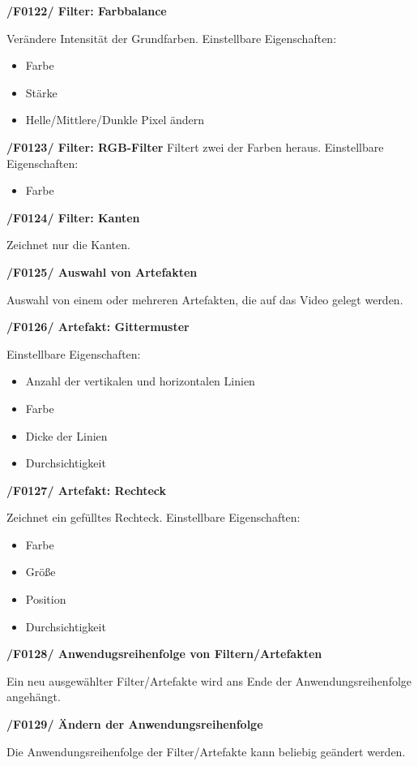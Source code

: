 \documentclass[parskip=full]{scrartcl}
\begin{document}
\textbf{/F0122/ Filter: Farbbalance}

Verändere Intensität der Grundfarben.
Einstellbare Eigenschaften:
\begin{itemize}
\item Farbe
\item Stärke
\item Helle/Mittlere/Dunkle Pixel ändern
\end{itemize}

\textbf{/F0123/ Filter: RGB-Filter}
Filtert zwei der Farben heraus.
Einstellbare Eigenschaften:
\begin{itemize}
\item Farbe
\end{itemize}

\textbf{/F0124/ Filter: Kanten}

Zeichnet nur die Kanten.

\textbf{/F0125/ Auswahl von Artefakten}

Auswahl von einem oder mehreren Artefakten, die auf das Video gelegt werden.

\textbf{/F0126/ Artefakt: Gittermuster}

Einstellbare Eigenschaften:
\begin{itemize}
\item Anzahl der vertikalen und horizontalen Linien
\item Farbe
\item Dicke der Linien
\item Durchsichtigkeit
\end{itemize}

\textbf{/F0127/ Artefakt: Rechteck}

Zeichnet ein gefülltes Rechteck.
Einstellbare Eigenschaften:
\begin{itemize}
\item Farbe
\item Größe
\item Position
\item Durchsichtigkeit
\end{itemize}




\textbf{/F0128/ Anwendugsreihenfolge von Filtern/Artefakten}

Ein neu ausgewählter Filter/Artefakte wird ans Ende der Anwendungsreihenfolge angehängt.

\textbf{/F0129/ Ändern der Anwendungsreihenfolge}

Die Anwendungsreihenfolge der Filter/Artefakte kann beliebig geändert werden.
\end{document}
